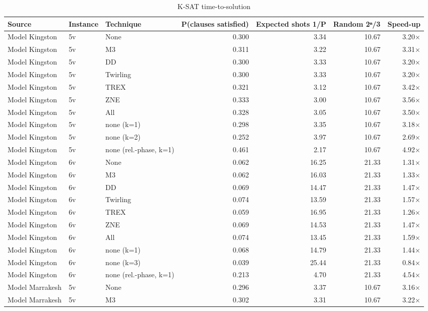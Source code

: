 \begin{table}[t]
\centering
\small
\caption{K-SAT time-to-solution}
\label{tab:tts}
\begin{tabular}{lllrrrr}
\toprule
Source & Instance & Technique & P(clauses satisfied) & Expected shots 1/P & Random 2ⁿ/3 & Speed-up \\
\midrule
Model Kingston & 5v & None & 0.300 & 3.34 & 10.67 & 3.20× \\
Model Kingston & 5v & M3 & 0.311 & 3.22 & 10.67 & 3.31× \\
Model Kingston & 5v & DD & 0.300 & 3.33 & 10.67 & 3.20× \\
Model Kingston & 5v & Twirling & 0.300 & 3.33 & 10.67 & 3.20× \\
Model Kingston & 5v & TREX & 0.321 & 3.12 & 10.67 & 3.42× \\
Model Kingston & 5v & ZNE & 0.333 & 3.00 & 10.67 & 3.56× \\
Model Kingston & 5v & All & 0.328 & 3.05 & 10.67 & 3.50× \\
Model Kingston & 5v & none (k=1) & 0.298 & 3.35 & 10.67 & 3.18× \\
Model Kingston & 5v & none (k=2) & 0.252 & 3.97 & 10.67 & 2.69× \\
Model Kingston & 5v & none (rel.-phase, k=1) & 0.461 & 2.17 & 10.67 & 4.92× \\
Model Kingston & 6v & None & 0.062 & 16.25 & 21.33 & 1.31× \\
Model Kingston & 6v & M3 & 0.062 & 16.03 & 21.33 & 1.33× \\
Model Kingston & 6v & DD & 0.069 & 14.47 & 21.33 & 1.47× \\
Model Kingston & 6v & Twirling & 0.074 & 13.59 & 21.33 & 1.57× \\
Model Kingston & 6v & TREX & 0.059 & 16.95 & 21.33 & 1.26× \\
Model Kingston & 6v & ZNE & 0.069 & 14.53 & 21.33 & 1.47× \\
Model Kingston & 6v & All & 0.074 & 13.45 & 21.33 & 1.59× \\
Model Kingston & 6v & none (k=1) & 0.068 & 14.79 & 21.33 & 1.44× \\
Model Kingston & 6v & none (k=3) & 0.039 & 25.44 & 21.33 & 0.84× \\
Model Kingston & 6v & none (rel.-phase, k=1) & 0.213 & 4.70 & 21.33 & 4.54× \\
Model Marrakesh & 5v & None & 0.296 & 3.37 & 10.67 & 3.16× \\
Model Marrakesh & 5v & M3 & 0.302 & 3.31 & 10.67 & 3.22× \\

\end{tabular}
\end{table}
